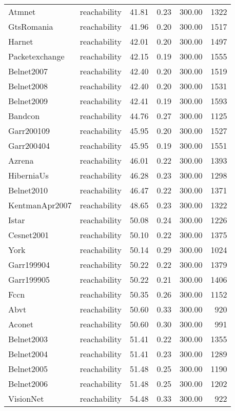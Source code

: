 \begin{tabular}{llrrrr}
Atmnet & reachability & 41.81 & 0.23 & 300.00 & 1322 \\
GtsRomania & reachability & 41.96 & 0.20 & 300.00 & 1517 \\
Harnet & reachability & 42.01 & 0.20 & 300.00 & 1497 \\
Packetexchange & reachability & 42.15 & 0.19 & 300.00 & 1555 \\
Belnet2007 & reachability & 42.40 & 0.20 & 300.00 & 1519 \\
Belnet2008 & reachability & 42.40 & 0.20 & 300.00 & 1531 \\
Belnet2009 & reachability & 42.41 & 0.19 & 300.00 & 1593 \\
Bandcon & reachability & 44.76 & 0.27 & 300.00 & 1125 \\
Garr200109 & reachability & 45.95 & 0.20 & 300.00 & 1527 \\
Garr200404 & reachability & 45.95 & 0.19 & 300.00 & 1551 \\
Azrena & reachability & 46.01 & 0.22 & 300.00 & 1393 \\
HiberniaUs & reachability & 46.28 & 0.23 & 300.00 & 1298 \\
Belnet2010 & reachability & 46.47 & 0.22 & 300.00 & 1371 \\
KentmanApr2007 & reachability & 48.65 & 0.23 & 300.00 & 1322 \\
Istar & reachability & 50.08 & 0.24 & 300.00 & 1226 \\
Cesnet2001 & reachability & 50.10 & 0.22 & 300.00 & 1375 \\
York & reachability & 50.14 & 0.29 & 300.00 & 1024 \\
Garr199904 & reachability & 50.22 & 0.22 & 300.00 & 1379 \\
Garr199905 & reachability & 50.22 & 0.21 & 300.00 & 1406 \\
Fccn & reachability & 50.35 & 0.26 & 300.00 & 1152 \\
Abvt & reachability & 50.60 & 0.33 & 300.00 & 920 \\
Aconet & reachability & 50.60 & 0.30 & 300.00 & 991 \\
Belnet2003 & reachability & 51.41 & 0.22 & 300.00 & 1355 \\
Belnet2004 & reachability & 51.41 & 0.23 & 300.00 & 1289 \\
Belnet2005 & reachability & 51.48 & 0.25 & 300.00 & 1190 \\
Belnet2006 & reachability & 51.48 & 0.25 & 300.00 & 1202 \\
VisionNet & reachability & 54.48 & 0.33 & 300.00 & 922 \\

\end{tabular}
